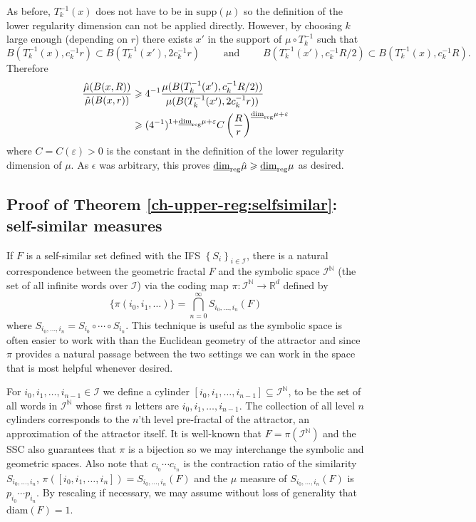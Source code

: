 As before, $T_k^{-1}(x)$ does not have to be in $\text{supp}(\mu)$ so the definition of the lower regularity dimension can not be applied directly. However, by choosing $k$ large enough (depending on $r$) there exists $x'$ in the support of $\mu \circ T_k^{-1}$ such that
\[
B(T_k^{-1}(x),c_k^{-1}r)\subset B(T_k^{-1}(x'),2c_k^{-1}r) \qquad \text{ and } \qquad   B(T_k^{-1}(x'),c_k^{-1}R/2) \subset B(T_k^{-1}(x), c_k^{-1}R).
\]
Therefore
\begin{align*}
\frac{\hat{\mu}(B(x,R))}{\hat{\mu}(B(x,r))} &\geqslant  4^{-1}\frac{\mu (B(T_k^{-1}(x'),c_k^{-1}R/2))}{\mu (B(T_k^{-1}(x'),2c_k^{-1}r))} \\
&\geqslant  (4^{-1})^{1+\underline{\dim}_{\textup{reg}} \mu+ \varepsilon}C \left(\frac{R}{r}\right)^{\underline{\dim}_{\textup{reg}} \mu + \varepsilon}
\end{align*}
where $C= C(\varepsilon)>0$ is the constant in the definition of the lower regularity dimension of $\mu$. As $\epsilon$ was arbitrary, this proves  $\underline{\dim}_{\textup{reg}} \hat{\mu} \geqslant \underline{\dim}_{\textup{reg}} \mu$ as desired.










\subsection{Proof of Theorem \ref{ch-upper-reg:selfsimilar}: self-similar measures} \label{ch-upper-reg:self-similar}


If $F$ is a self-similar set defined with the IFS $\left\{S_i \right\}_{i\in \mathcal{I}}$, there is a natural correspondence between the geometric fractal $F$ and the symbolic space $\mathcal{I}^{\mathbb{N}}$ (the set of all infinite words over $\mathcal{I}$) via the coding map $\pi \colon \mathcal{I}^{\mathbb{N}} \rightarrow \mathbb{R}^d$ defined by 
\[
\{\pi(i_0,i_1,\ldots) \} =  \bigcap_{n=0}^\infty S_{i_0,\ldots, i_n}(F)
\]
where $S_{i_0,\ldots, i_n} = S_{i_0} \circ \cdots \circ S_{ i_n}$. This technique is useful as the symbolic space is often easier to work with than the Euclidean geometry of the attractor and since $\pi$ provides a natural passage between the two settings we can work in the space that is most helpful whenever desired. 

For $ i_0,i_1,\ldots, i_{n-1} \in \mathcal{I}$ we define a cylinder $[i_0,i_1,\ldots, i_{n-1}] \subseteq \mathcal{I}^\mathbb{N}$, to be the set of all words in $\mathcal{I}^{\mathbb{N}}$ whose first $n$ letters are $i_0,i_1,\ldots, i_{n-1}$. The collection of all level $n$ cylinders corresponds to the  $n$'th level  pre-fractal of the attractor, an approximation of the attractor itself.  It is well-known that $F= \pi(\mathcal{I}^\mathbb{N})$ and the SSC also guarantees that $\pi$ is a bijection so we may interchange the symbolic and geometric spaces.  Also note that  $c_{i_0}\cdots c_{i_{n}}$ is the contraction ratio of the similarity $S_{i_0,\ldots, i_n} $,  $\pi([i_0,i_1,\ldots, i_{n}] ) = S_{i_0,\ldots, i_n} (F)$ and the $\mu$ measure of $S_{i_0,\ldots, i_n} (F)$  is $p_{i_0}\cdots p_{i_{n}}$.  By rescaling if necessary, we may assume without loss of generality that diam$(F)=1$. 


